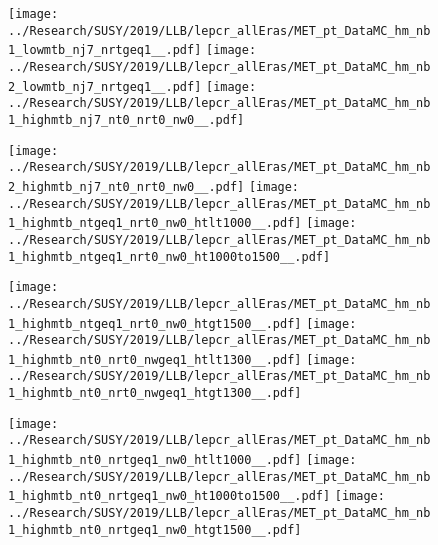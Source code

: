 \begin{figure}[!htb]
  \texttt{[image: ../Research/SUSY/2019/LLB/lepcr\_allEras/MET\_pt\_DataMC\_hm\_nb1\_lowmtb\_nj7\_nrtgeq1\_\_.pdf]}
\endminipage\hfill
{}
  \texttt{[image: ../Research/SUSY/2019/LLB/lepcr\_allEras/MET\_pt\_DataMC\_hm\_nb2\_lowmtb\_nj7\_nrtgeq1\_\_.pdf]}
\endminipage\hfill
{}
  \texttt{[image: ../Research/SUSY/2019/LLB/lepcr\_allEras/MET\_pt\_DataMC\_hm\_nb1\_highmtb\_nj7\_nt0\_nrt0\_nw0\_\_.pdf]}
\endminipage
\end{figure}

\begin{figure}[!htb]
  \texttt{[image: ../Research/SUSY/2019/LLB/lepcr\_allEras/MET\_pt\_DataMC\_hm\_nb2\_highmtb\_nj7\_nt0\_nrt0\_nw0\_\_.pdf]}
\endminipage\hfill
{}
  \texttt{[image: ../Research/SUSY/2019/LLB/lepcr\_allEras/MET\_pt\_DataMC\_hm\_nb1\_highmtb\_ntgeq1\_nrt0\_nw0\_htlt1000\_\_.pdf]}
\endminipage\hfill
{}
  \texttt{[image: ../Research/SUSY/2019/LLB/lepcr\_allEras/MET\_pt\_DataMC\_hm\_nb1\_highmtb\_ntgeq1\_nrt0\_nw0\_ht1000to1500\_\_.pdf]}
\endminipage
\end{figure}

\begin{figure}[!htb]
  \texttt{[image: ../Research/SUSY/2019/LLB/lepcr\_allEras/MET\_pt\_DataMC\_hm\_nb1\_highmtb\_ntgeq1\_nrt0\_nw0\_htgt1500\_\_.pdf]}
\endminipage\hfill
{}
  \texttt{[image: ../Research/SUSY/2019/LLB/lepcr\_allEras/MET\_pt\_DataMC\_hm\_nb1\_highmtb\_nt0\_nrt0\_nwgeq1\_htlt1300\_\_.pdf]}
\endminipage\hfill
{}
  \texttt{[image: ../Research/SUSY/2019/LLB/lepcr\_allEras/MET\_pt\_DataMC\_hm\_nb1\_highmtb\_nt0\_nrt0\_nwgeq1\_htgt1300\_\_.pdf]}
\endminipage
\end{figure}

\begin{figure}[!htb]
  \texttt{[image: ../Research/SUSY/2019/LLB/lepcr\_allEras/MET\_pt\_DataMC\_hm\_nb1\_highmtb\_nt0\_nrtgeq1\_nw0\_htlt1000\_\_.pdf]}
\endminipage\hfill
{}
  \texttt{[image: ../Research/SUSY/2019/LLB/lepcr\_allEras/MET\_pt\_DataMC\_hm\_nb1\_highmtb\_nt0\_nrtgeq1\_nw0\_ht1000to1500\_\_.pdf]}
\endminipage\hfill
{}
  \texttt{[image: ../Research/SUSY/2019/LLB/lepcr\_allEras/MET\_pt\_DataMC\_hm\_nb1\_highmtb\_nt0\_nrtgeq1\_nw0\_htgt1500\_\_.pdf]}
\endminipage
\end{figure}

